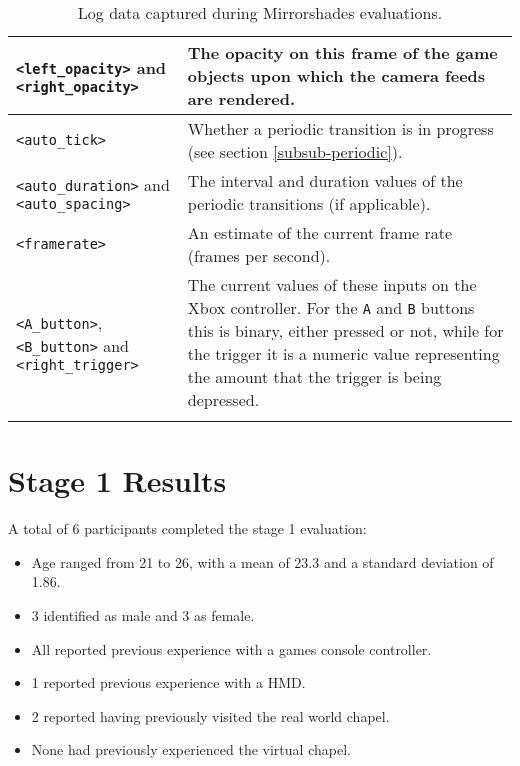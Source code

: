 \begin{center}
\begin{longtable}{ l  p{6.5cm} }
\midrule

\texttt{<left\_opacity>} and \texttt{<right\_opacity>} & The opacity on this frame of the game objects upon which the camera feeds are rendered. \\

\midrule

\texttt{<auto\_tick>} & Whether a periodic transition is in progress (see section \ref{subsub-periodic}). \\

\midrule

\texttt{<auto\_duration>} and \texttt{<auto\_spacing>} & The interval and duration values of the periodic transitions (if applicable). \\

\midrule

\texttt{<framerate>} & An estimate of the current frame rate (frames per second). \\

\midrule

\texttt{<A\_button>}, \texttt{<B\_button>} and \texttt{<right\_trigger>} & The current values of these inputs on the Xbox controller. For the \texttt{A} and \texttt{B} buttons this is binary, either pressed or not, while for the trigger it is a numeric value representing the amount that the trigger is being depressed. \\

\bottomrule
\caption{Log data captured during Mirrorshades evaluations.}
\label{logdatatable}
\end{longtable}
\end{center}


\section{Stage 1 Results}

A total of 6 participants completed the stage 1 evaluation:
\begin{itemize}
	\item Age ranged from 21 to 26, with a mean of 23.3 and a standard deviation of 1.86.
	\item 3 identified as male and 3 as female.
	\item All reported previous experience with a games console controller.
	\item 1 reported previous experience with a HMD.
	\item 2 reported having previously visited the real world chapel.
	\item None had previously experienced the virtual chapel.
\end{itemize}

